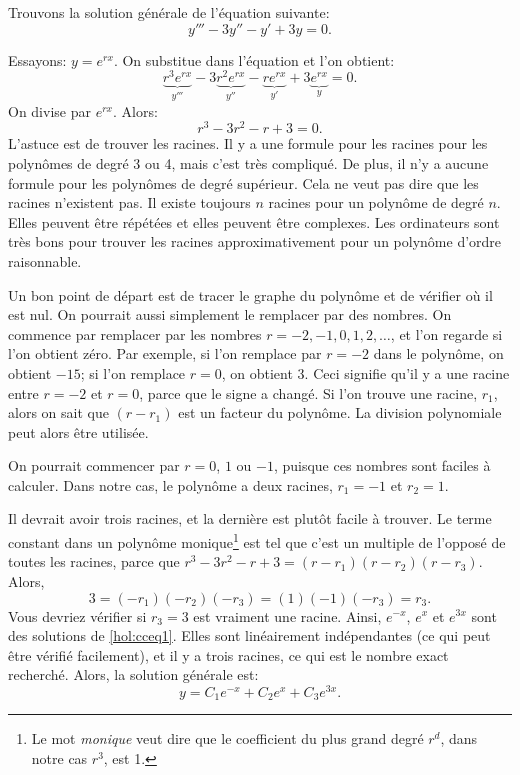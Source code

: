 \begin{example}
	Trouvons la solution générale de l'équation suivante:
	\begin{equation} \label{hol:cceq1}
		y''' - 3 y'' - y' + 3y = 0 .
	\end{equation}
	
	Essayons: $y = e^{rx}$. On substitue dans l'équation et l'on obtient:
	\begin{equation*}
		\underbrace{r^3 e^{rx}}_{y'''} - 3 \underbrace{r^2 e^{rx}}_{y''} -
		\underbrace{r e^{rx}}_{y'} + 3 \underbrace{e^{rx}}_{y} = 0 .
	\end{equation*}
	On divise par $e^{rx}$.  Alors: 
	\begin{equation*}
		r^3 - 3 r^2 - r + 3 = 0 .
	\end{equation*}
	L'astuce est de trouver les racines. Il y a une formule pour les racines pour les polynômes de degré 3 ou 4, mais c'est très compliqué. De plus, il n'y a aucune formule pour les polynômes de degré supérieur. Cela ne veut pas dire que les racines n'existent pas. Il existe toujours 
	$n$ racines pour un polynôme de degré  $n$.  Elles peuvent être répétées 
	et elles peuvent être complexes. Les ordinateurs sont très bons pour trouver les racines approximativement pour un polynôme d'ordre  raisonnable.
	
	Un bon point de départ est de tracer le graphe du polynôme et de vérifier où il est nul.
	On pourrait aussi simplement le remplacer par des nombres. 
	On commence par remplacer par les nombres  $r=-2, -1, 0, 1, 2, \ldots$, et l'on regarde si l'on obtient zéro. 
	Par exemple, si l'on remplace par $r=-2$ dans le polynôme, on obtient $-15$; si l'on remplace $r=0$, on obtient 3.
	Ceci signifie qu'il y a une racine entre $r=-2$ et $r=0$,
	parce que le signe a changé.
	Si l'on trouve une racine, $r_1$, alors on sait que $(r-r_1)$ est un facteur du polynôme. La division polynomiale peut alors être utilisée. 
	
	On pourrait commencer par $r=0$, $1$ ou $-1$, puisque ces nombres sont faciles à calculer. Dans notre cas, le polynôme a deux racines,  $r_1 = -1$
	et $r_2 = 1$.  
	
	Il devrait avoir trois racines, et la dernière est plutôt facile à trouver. Le terme constant dans un polynôme monique\footnote{Le mot \emph{monique} veut dire que le coefficient du plus grand degré $r^d$, dans notre cas $r^3$, est 1.}
	est tel que c'est un multiple de l'opposé de toutes les racines, parce que 
	$r^3 - 3 r^2 - r + 3 = (r-r_1)(r-r_2)(r-r_3)$.
	Alors,
	\begin{equation*}
		3 = (-r_1)(-r_2)(-r_3) = (1)(-1)(-r_3) = r_3 .
	\end{equation*}
	Vous devriez vérifier si  $r_3 = 3$ est vraiment une racine.  
	Ainsi, $e^{-x}$, $e^{x}$
	et $e^{3x}$ sont des solutions de \eqref{hol:cceq1}.  
	Elles sont linéairement indépendantes (ce qui peut être vérifié facilement), et il y a trois racines, 
	ce qui est le nombre exact recherché. 
	Alors, la solution générale est: 
	\begin{equation*}
		y = C_1 e^{-x} + C_2 e^{x} + C_3 e^{3x} .
	\end{equation*}
	

\end{example}
